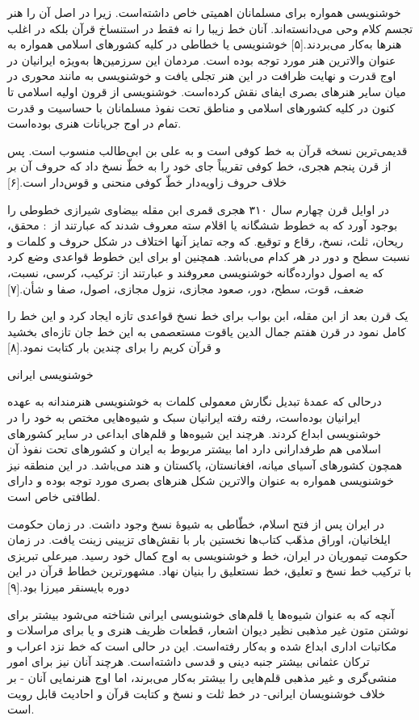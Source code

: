 \documentclass[a4paper]{article}
\begin{document}
خوشنویسی همواره برای مسلمانان اهمیتی خاص داشته‌است. زیرا در اصل آن را هنر تجسم کلام وحی می‌دانسته‌اند. آنان خط زیبا را نه فقط در استنساخ قرآن بلکه در اغلب هنرها به‌کار می‌بردند.[۵] خوشنویسی یا خطاطی در کلیه کشورهای اسلامی همواره به عنوان والاترین هنر مورد توجه بوده است. مردمان این سرزمین‌ها به‌ویژه ایرانیان در اوج قدرت و نهایت ظرافت در این هنر تجلی یافت و خوشنویسی به مانند محوری در میان سایر هنرهای بصری ایفای نقش کرده‌است. خوشنویسی از قرون اولیه اسلامی تا کنون در کلیه کشورهای اسلامی و مناطق تحت نفوذ مسلمانان با حساسیت و قدرت تمام در اوج جریانات هنری بوده‌است.

قدیمی‌ترین نسخه قرآن به خط کوفی است و به علی بن ابی‌طالب منسوب است. پس از قرن پنجم هجری، خط کوفی تقریباً جای خود را به خطّ نسخ داد که حروف آن بر خلاف حروف زاویه‌دار خطّ کوفی منحنی و قوس‌دار است.[۶]

در اوایل قرن چهارم سال ۳۱۰ هجری قمری ابن مقله بیضاوی شیرازی خطوطی را بوجود آورد که به خطوط ششگانه یا اقلام سته معروف شدند که عبارتند از : محقق، ریحان، ثلث، نسخ، رقاع و توقیع. که وجه تمایز آنها اختلاف در شکل حروف و کلمات و نسبت سطح و دور در هر کدام می‌باشد. همچنین او برای این خطوط قواعدی وضع کرد که یه اصول دوارده‌گانه خوشنویسی معروفند و عبارتند از: ترکیب، کرسی، نسبت، ضعف، قوت، سطح، دور، صعود مجازی، نزول مجازی، اصول، صفا و شأن.[۷]

یک قرن بعد از ابن مقله، ابن بواب برای خط نسخ قواعدی تازه ایجاد کرد و این خط را کامل نمود در قرن هفتم جمال الدین یاقوت مستعصمی به این خط جان تازه‌ای بخشید و قرآن کریم را برای چندین بار کتابت نمود.[۸]



خوشنویسی ایرانی

درحالی که عمدهٔ تبدیل نگارش معمولی کلمات به خوشنویسی هنرمندانه به عهده ایرانیان بوده‌است، رفته رفته ایرانیان سبک و شیوه‌هایی مختص به خود را در خوشنویسی ابداع کردند. هرچند این شیوه‌ها و قلم‌های ابداعی در سایر کشورهای اسلامی هم طرفدارانی دارد اما بیشتر مربوط به ایران و کشورهای تحت نفوذ آن همچون کشورهای آسیای میانه، افغانستان، پاکستان و هند می‌باشد. در این منطقه نیز خوشنویسی همواره به عنوان والاترین شکل هنرهای بصری مورد توجه بوده و دارای لطافتی خاص است.

در ایران پس از فتح اسلام، خطّاطی به شیوهٔ نسخ وجود داشت. در زمان حکومت ایلخانیان، اوراق مذهّب کتاب‌ها نخستین بار با نقش‌های تزیینی زینت یافت. در زمان حکومت تیموریان در ایران، خط و خوشنویسی به اوج کمال خود رسید. میرعلی تبریزی با ترکیب خط نسخ و تعلیق، خط نستعلیق را بنیان نهاد. مشهورترین خطاط قرآن در این دوره بایسنقر میرزا بود.[۹]

آنچه که به عنوان شیوه‌ها یا قلم‌های خوشنویسی ایرانی شناخته می‌شود بیشتر برای نوشتن متون غیر مذهبی نظیر دیوان اشعار، قطعات ظریف هنری و یا برای مراسلات و مکاتبات اداری ابداع شده و به‌کار رفته‌است. این در حالی است که خط نزد اعراب و ترکان عثمانی بیشتر جنبه دینی و قدسی داشته‌است. هرچند آنان نیز برای امور منشی‌گری و غیر مذهبی قلم‌هایی را بیشتر به‌کار می‌برند، اما اوج هنرنمایی آنان - بر خلاف خوشنویسان ایرانی- در خط ثلت و نسخ و کتابت قرآن و احادیث قابل رویت است.
\end{document}
